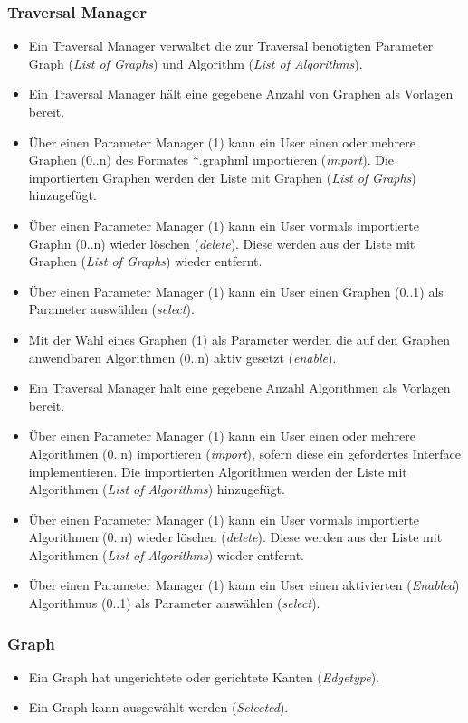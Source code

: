 \subsubsection{Traversal Manager}
\label{subsubsec:Traversal Manager}
\begin{itemize}
  \item Ein Traversal Manager verwaltet die zur Traversal ben\"otigten Parameter Graph (\textit{List of Graphs}) und Algorithm (\textit{List of Algorithms}).
  \item Ein Traversal Manager h\"alt eine gegebene Anzahl von Graphen als Vorlagen bereit.
  \item \"Uber einen Parameter Manager (1) kann ein User einen oder mehrere Graphen (0..n) des Formates *.graphml importieren (\textit{import}). Die importierten Graphen werden der Liste mit Graphen (\textit{List of Graphs}) hinzugef\"ugt.
  \item \"Uber einen Parameter Manager (1) kann ein User vormals importierte Graphn (0..n) wieder l\"oschen (\textit{delete}). Diese werden aus der Liste mit Graphen (\textit{List of Graphs}) wieder entfernt.
  \item \"Uber einen Parameter Manager (1) kann ein User einen Graphen (0..1) als Parameter ausw\"ahlen (\textit{select}).
  \item Mit der Wahl eines Graphen (1) als Parameter werden die auf den Graphen anwendbaren Algorithmen (0..n) aktiv gesetzt (\textit{enable}).
  \item Ein Traversal Manager h\"alt eine gegebene Anzahl Algorithmen als Vorlagen bereit.
  \item \"Uber einen Parameter Manager (1) kann ein User einen oder mehrere Algorithmen (0..n) importieren (\textit{import}), sofern diese ein gefordertes Interface implementieren. Die importierten Algorithmen werden der Liste mit Algorithmen (\textit{List of Algorithms}) hinzugef\"ugt.
  \item \"Uber einen Parameter Manager (1) kann ein User vormals importierte Algorithmen (0..n) wieder l\"oschen (\textit{delete}). Diese werden aus der Liste mit Algorithmen (\textit{List of Algorithms}) wieder entfernt.
  \item \"Uber einen Parameter Manager (1) kann ein User einen aktivierten (\textit{Enabled}) Algorithmus (0..1) als Parameter ausw\"ahlen (\textit{select}).
\end{itemize}
% 
\subsubsection{Graph}
\label{subsubsec:Graph}
\begin{itemize}
  \item Ein Graph hat ungerichtete oder gerichtete Kanten (\textit{Edgetype}).
  \item Ein Graph kann ausgew\"ahlt werden (\textit{Selected}).
\end{itemize}
% 
